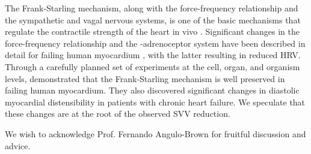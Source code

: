 \documentclass[%
preprint,
 amsmath,amssymb,
 aps,
]{revtex4-2}
\begin{document}
The Frank-Starling mechanism, along with the force-frequency relationship and the sympathetic and vagal nervous systems, is one of the basic mechanisms that regulate the contractile strength of the heart in vivo \citep{Holubarsch_1996}. Significant changes in the force-frequency relationship and the \textbeta-adrenoceptor system have been described in detail for failing human myocardium \citep{Mulieri_1992, Pieske_1992, Bristow_1982, Bristow_1989},  with the latter resulting in reduced HRV. Through a carefully planned set of experiments at the cell, organ, and organism levels, \citet{Holubarsch_1996} demonstrated that the Frank-Starling mechanism is well preserved in failing human myocardium. They also discovered significant changes in diastolic myocardial distensibility in patients with chronic heart failure. We speculate that these changes are at the root of the observed SVV reduction.

\begin{acknowledgments}
We wish to acknowledge Prof. Fernando Angulo-Brown for fruitful discussion and advice.
\end{acknowledgments}



\end{document}
